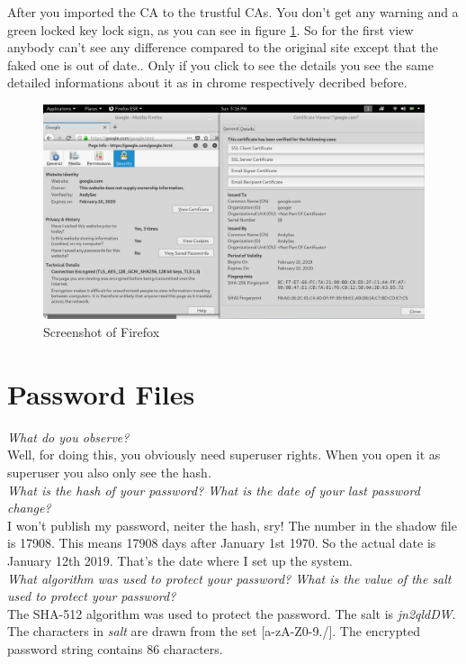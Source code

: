 After you imported the CA to the trustful CAs. You don't get any warning and a green locked key lock sign, as you can see in figure \ref{fig:firefox}. So for the first view anybody can't see any difference compared to the original site except that the faked one is out of date.. 
Only if you click to see the details you see the same detailed informations about it as in chrome respectively decribed before.


\begin{figure}[htp]
    \centering
    \caption{Screenshot of Firefox}
    \label{fig:firefox}
    \includegraphics[width=\textwidth]{firefox.png}
\end{figure}


\section{Password Files}

\textit{What do you observe?}\\
Well, for doing this, you obviously need superuser rights. When you open it as superuser you also only see the hash.\\

\textit{What is the hash of your password? What is the date of your last password change?}\\
I won't publish my password, neiter the hash, sry!
The number in the shadow file is 17908. This means 17908 days after January 1st 1970. So the actual date is January 12th 2019. That's the date where I set up the system.\\

\textit{What algorithm was used to protect your password? What is the value of the salt used to protect your password?}\\
The SHA-512 algorithm was used to protect the password. The salt is \textit{jn2qldDW}. The characters in \textit{salt} are drawn from the set [a-zA-Z0-9./]. The encrypted password string contains 86 characters.\\


